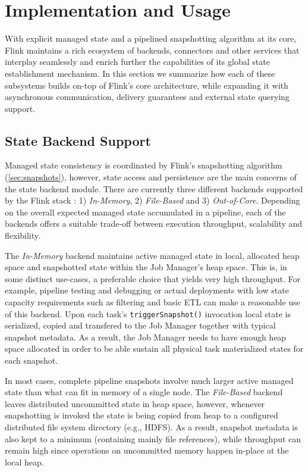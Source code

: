 

\section{Implementation and Usage}

With explicit managed state and a pipelined snapshotting algorithm at its core, Flink maintains a rich ecosystem of backends, connectors and other services that interplay seamlessly and enrich further the capabilities of its global state establishment mechanism. In this section we summarize how each of these subsystems builds on-top of Flink's core architecture, while expanding it with asynchronous communication, delivery guarantees and external state querying support.

\label{sec:implementation}

\subsection{State Backend Support}

Managed state consistency is coordinated by Flink's snapshotting algorithm (\autoref{sec:snapshots}), however, state access and persistence are the main concerns of the state backend module. There are currently three different backends supported by the Flink stack : 1) \emph{In-Memory}, 2) \emph{File-Based} and 3) \emph{Out-of-Core}. Depending on the overall expected managed state accumulated in a pipeline, each of the backends offers a suitable trade-off between execution throughput, scalability and flexibility.

The \emph{In-Memory} backend maintains active managed state in local, allocated heap space and snapshotted state within the Job Manager's heap space. This is, in some distinct use-cases, a preferable choice that yields very high throughput. For example, pipeline testing and debugging or actual deployments with low state capacity requirements such as filtering and basic ETL can make a reasonable use of this backend. Upon each task's \texttt{triggerSnapshot()} invocation local state is serialized, copied and transfered to the Job Manager together with typical snapshot metadata. As a result, the Job Manager needs to have enough heap space allocated in order to be able sustain all physical task materialized states for each snapshot.

In most cases, complete pipeline snapshots involve much larger active managed state than what can fit in memory of a single node. The \emph{File-Based} backend leaves distributed uncommitted state in heap space, however, whenever snapshotting is invoked the state is being copied from heap to a configured distributed file system directory (e.g., HDFS). As a result, snapshot metadata is also kept to a minimum (containing mainly file references), while throughput can remain high since operations on uncommitted memory happen in-place at the local heap.

